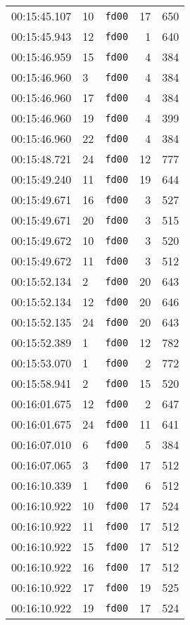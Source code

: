 \documentclass{article}
\begin{document}
\begin{longtable}{lllrr}
00:15:45.107 & 10 & \texttt{fd00} & 17 & 650 \\
00:15:45.943 & 12 & \texttt{fd00} & 1 & 640 \\
00:15:46.959 & 15 & \texttt{fd00} & 4 & 384 \\
00:15:46.960 & 3 & \texttt{fd00} & 4 & 384 \\
00:15:46.960 & 17 & \texttt{fd00} & 4 & 384 \\
00:15:46.960 & 19 & \texttt{fd00} & 4 & 399 \\
00:15:46.960 & 22 & \texttt{fd00} & 4 & 384 \\
00:15:48.721 & 24 & \texttt{fd00} & 12 & 777 \\
00:15:49.240 & 11 & \texttt{fd00} & 19 & 644 \\
00:15:49.671 & 16 & \texttt{fd00} & 3 & 527 \\
00:15:49.671 & 20 & \texttt{fd00} & 3 & 515 \\
00:15:49.672 & 10 & \texttt{fd00} & 3 & 520 \\
00:15:49.672 & 11 & \texttt{fd00} & 3 & 512 \\
00:15:52.134 & 2 & \texttt{fd00} & 20 & 643 \\
00:15:52.134 & 12 & \texttt{fd00} & 20 & 646 \\
00:15:52.135 & 24 & \texttt{fd00} & 20 & 643 \\
00:15:52.389 & 1 & \texttt{fd00} & 12 & 782 \\
00:15:53.070 & 1 & \texttt{fd00} & 2 & 772 \\
00:15:58.941 & 2 & \texttt{fd00} & 15 & 520 \\
00:16:01.675 & 12 & \texttt{fd00} & 2 & 647 \\
00:16:01.675 & 24 & \texttt{fd00} & 11 & 641 \\
00:16:07.010 & 6 & \texttt{fd00} & 5 & 384 \\
00:16:07.065 & 3 & \texttt{fd00} & 17 & 512 \\
00:16:10.339 & 1 & \texttt{fd00} & 6 & 512 \\
00:16:10.922 & 10 & \texttt{fd00} & 17 & 524 \\
00:16:10.922 & 11 & \texttt{fd00} & 17 & 512 \\
00:16:10.922 & 15 & \texttt{fd00} & 17 & 512 \\
00:16:10.922 & 16 & \texttt{fd00} & 17 & 512 \\
00:16:10.922 & 17 & \texttt{fd00} & 19 & 525 \\
00:16:10.922 & 19 & \texttt{fd00} & 17 & 524 \\

\end{longtable}
\end{document}
